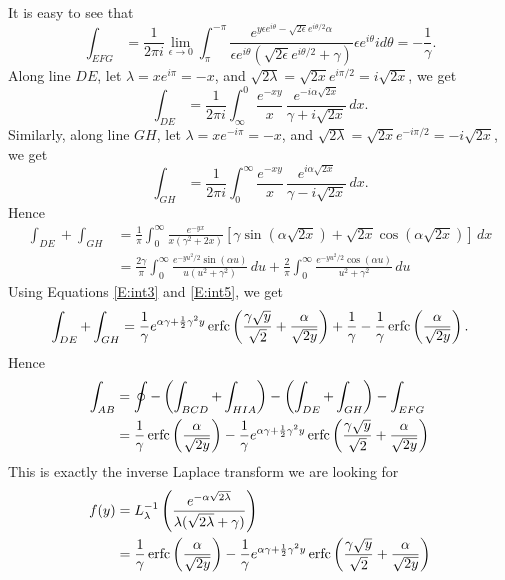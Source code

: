 It is easy to see that
\[
  \int_{EFG} = \frac{1}{2\pi i} \lim_{\epsilon \to 0} 
    \int_{\pi}^{-\pi} 
    \frac{ e^{ y \epsilon e^{i\theta} - \sqrt{2\epsilon} e^{i\theta/2} \alpha } }
         { \epsilon e^{i\theta} (\sqrt{2\epsilon} e^{i\theta/2} + \gamma) }
    \epsilon e^{i\theta} i d\theta
   = - \frac{1}{\gamma}.
\]
Along line $DE$, let $\lambda=x e^{i\pi}=-x$, 
and $\sqrt{2\lambda}=\sqrt{2x} e^{i\pi /2}=i \sqrt{2x}$, we get
\[
  \int_{DE} = \frac{1}{2\pi i} 
    \int_{\infty}^0 \frac{e^{-xy}}{x}\, 
      \frac{e^{-i\alpha\sqrt{2x}}}{\gamma+i\sqrt{2x}}\, dx.
\]
Similarly, along line $GH$, let $\lambda=x e^{-i\pi}=-x$, 
and $\sqrt{2\lambda}=\sqrt{2x} e^{-i\pi /2}=-i \sqrt{2x}$, we get
\[
  \int_{GH} = \frac{1}{2\pi i} 
    \int^{\infty}_0 \frac{e^{-xy}}{x}\, 
      \frac{e^{i\alpha\sqrt{2x}}}{\gamma-i\sqrt{2x}}\, dx.
\]
Hence
\begin{align*}
  \int_{DE} + \int_{GH} 
  &= \frac{1}{\pi} \int_0^{\infty} \frac{e^{-yx}}{x(\gamma^2+2x)}
       \left[
         \gamma \sin(\alpha \sqrt{2x}) + \sqrt{2x} \cos(\alpha \sqrt{2x})
       \right] \, dx  \\
  &= \frac{2\gamma}{\pi} \int_0^{\infty} 
       \frac{e^{-yu^2/2} \sin(\alpha u)}{u(u^2+\gamma^2)} \, du
     + \frac{2}{\pi} \int_0^{\infty} 
       \frac{e^{-yu^2/2} \cos(\alpha u)}{u^2+\gamma^2} \, du
\end{align*}
Using Equations \ref{E:int3} and \ref{E:int5}, we get
\[
  \int_{DE} + \int_{GH} 
  = \frac{1}{\gamma} e^{\alpha \gamma+\frac{1}{2}\gamma^2 y} 
      \operatorname*{erfc} \left( \frac{\gamma \sqrt{y}}{\sqrt{2}}+ \frac{\alpha}{\sqrt{2y}} \right)
    + \frac{1}{\gamma} - \frac{1}{\gamma} \operatorname*{erfc} \left( \frac{\alpha}{\sqrt{2y}}
\right).
\]
Hence 
\begin{align*}
  \int_{AB} &= \oint - \left( \int_{BCD} + \int_{HIA} \right)
               - \left( \int_{DE} + \int_{GH} \right) - \int_{EFG}  \\
            &= \frac{1}{\gamma} \operatorname*{erfc} \left( \frac{\alpha}{\sqrt{2y}} \right)
               - \frac{1}{\gamma} e^{\alpha \gamma+\frac{1}{2}\gamma^2 y} 
                 \operatorname*{erfc} 
                   \left( 
                     \frac{\gamma \sqrt{y}}{\sqrt{2}} + \frac{\alpha}{\sqrt{2y}} 
                   \right)
\end{align*}
This is exactly the inverse Laplace transform we are looking for
\begin{align} \label{E:ilt1}
  f(y) &= L_{\lambda}^{-1} 
          \left( 
            \frac{e^{-\alpha \sqrt{2\lambda}}}{\lambda(\sqrt{2\lambda}+\gamma)} 
          \right)   \notag \\  
       &= \frac{1}{\gamma} \operatorname*{erfc} \left( \frac{\alpha}{\sqrt{2y}} \right)
          - \frac{1}{\gamma} e^{\alpha \gamma+\frac{1}{2}\gamma^2 y} 
            \operatorname*{erfc} 
              \left( 
                \frac{\gamma \sqrt{y}}{\sqrt{2}}+ \frac{\alpha}{\sqrt{2y}} 
              \right)
\end{align}


